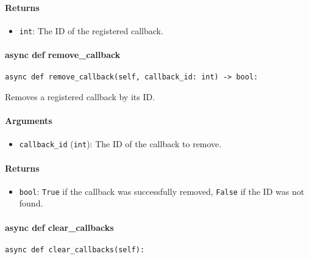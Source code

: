 \documentclass{article}
\begin{document}
\paragraph{Returns}

\begin{itemize}
    \item \lstinline[style=pythonstyle]|int|: The ID of the registered callback.
\end{itemize}

\paragraph{async def remove\_callback}

\begin{lstlisting}[style=pythonstyle]
async def remove_callback(self, callback_id: int) -> bool:
\end{lstlisting}

\noindent Removes a registered callback by its ID.

\paragraph{Arguments}

\begin{itemize}
    \item \lstinline[style=pythonstyle]|callback_id| (\lstinline[style=pythonstyle]|int|): The ID of the callback to remove.
\end{itemize}

\paragraph{Returns}

\begin{itemize}
    \item \lstinline[style=pythonstyle]|bool|: \lstinline[style=pythonstyle]|True| if the callback was successfully removed, \lstinline[style=pythonstyle]|False| if the ID was not found.
\end{itemize}

\paragraph{async def clear\_callbacks}

\begin{lstlisting}[style=pythonstyle]
async def clear_callbacks(self):
\end{lstlisting}
\end{document}
